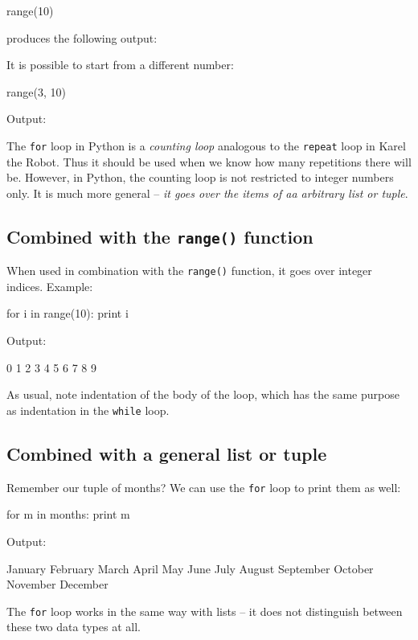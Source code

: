 \begin{bluecode}
range(10)
\end{bluecode}
produces the following output:

\begin{bluecode}
[0, 1, 2, 3, 4, 5, 6, 7, 8, 9]
\end{bluecode}
It is possible to start from a different number:

\begin{bluecode}
range(3, 10)
\end{bluecode}
Output:

\begin{bluecode}
[3, 4, 5, 6, 7, 8, 9]
\end{bluecode}
The {\tt for} loop in Python is a {\em counting loop} analogous to the {\tt repeat}
loop in Karel the Robot. Thus it should be used when we know how many repetitions there 
will be. However, in Python, the counting loop is not restricted to integer numbers 
only. It is much more general -- {\em it goes over the items of aa arbitrary list or tuple}. 

\subsection{Combined with the {\tt range()} function}

When used in combination with the {\tt range()} function, it goes over integer indices. 
Example:

\begin{bluecode}
for i in range(10):
    print i
\end{bluecode}
Output:

\begin{bluecode}
0
1
2
3
4
5
6
7
8
9
\end{bluecode}
As usual, note indentation of the body of the loop, which has the same 
purpose as indentation in the {\tt while} loop. 

\subsection{Combined with a general list or tuple}

Remember our tuple of months? We can use the {\tt for} loop to print them as well:

\begin{bluecode}
for m in months:
    print m
\end{bluecode}
Output:

\begin{bluecode}
January
February
March
April
May
June
July
August
September
October
November
December
\end{bluecode}
The {\tt for} loop works in the same way with lists -- it does not distinguish between these 
two data types at all.

